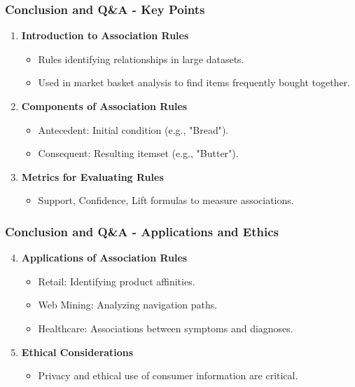 \documentclass[aspectratio=169]{beamer}
\begin{document}
\begin{frame}[fragile]
    \frametitle{Conclusion and Q\&A - Key Points}
    \begin{enumerate}
        \item \textbf{Introduction to Association Rules}
            \begin{itemize}
                \item Rules identifying relationships in large datasets.
                \item Used in market basket analysis to find items frequently bought together.
            \end{itemize}
        
        \item \textbf{Components of Association Rules}
            \begin{itemize}
                \item Antecedent: Initial condition (e.g., "Bread").
                \item Consequent: Resulting itemset (e.g., "Butter").
            \end{itemize}
        
        \item \textbf{Metrics for Evaluating Rules}
            \begin{itemize}
                \item Support, Confidence, Lift formulas to measure associations.
            \end{itemize}
    \end{enumerate}
\end{frame}

\begin{frame}[fragile]
    \frametitle{Conclusion and Q\&A - Applications and Ethics}
    \begin{enumerate}
        \setcounter{enumii}{3} %
        \item \textbf{Applications of Association Rules}
            \begin{itemize}
                \item Retail: Identifying product affinities.
                \item Web Mining: Analyzing navigation paths.
                \item Healthcare: Associations between symptoms and diagnoses.
            \end{itemize}
        
        \item \textbf{Ethical Considerations}
            \begin{itemize}
                \item Privacy and ethical use of consumer information are critical.
            \end{itemize}
    \end{enumerate}
\end{frame}
\end{document}
